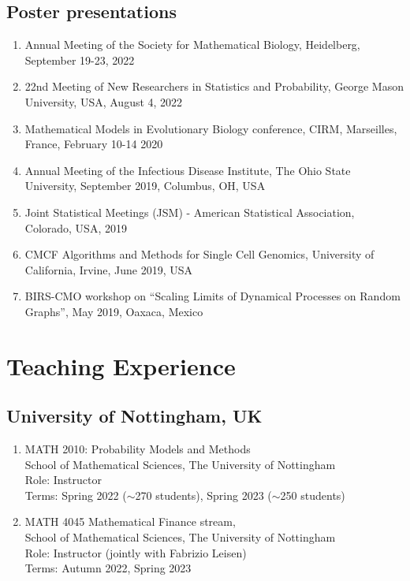 \documentclass[11pt,a4paper,sans]{moderncv}        %
\begin{document}
\subsection{Poster presentations}
\begin{enumerate}
	\item Annual Meeting of the Society for Mathematical Biology, Heidelberg, September 19-23, 2022
	\item 22nd Meeting of New Researchers in Statistics and Probability, George Mason University, USA, August 4, 2022
	\item {Mathematical Models in Evolutionary Biology conference, CIRM, Marseilles, France, February 10-14 2020}
	\item{Annual Meeting of the Infectious Disease Institute, The Ohio State University, September 2019, Columbus, OH, USA}
	\item{Joint Statistical Meetings (JSM) - American Statistical Association, Colorado, USA, 2019} 
	\item {CMCF Algorithms and Methods for Single Cell Genomics, University of California, Irvine, June 2019, USA}
	\item {BIRS-CMO workshop on ``Scaling Limits of Dynamical Processes on Random Graphs'', May 2019, Oaxaca, Mexico}
\end{enumerate}

\section{Teaching Experience}
\subsection{University of Nottingham, UK}
\begin{enumerate}
	\item MATH 2010: Probability Models and Methods\\School of Mathematical Sciences, The University of Nottingham\\Role: Instructor\\Terms: Spring 2022 ($\sim$270 students), Spring 2023 ($\sim$250 students)
	\item MATH 4045 Mathematical Finance stream, \\School of Mathematical Sciences, The University of Nottingham\\Role: Instructor (jointly with Fabrizio Leisen)\\Terms: Autumn 2022, Spring 2023
\end{enumerate}
\end{document}
